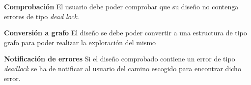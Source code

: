 \begin{functional}
	\item \textbf{Comprobación}\newline
		El usuario debe poder comprobar que su diseño no contenga errores de tipo \textit{dead lock}.
		\begin{functional}
			\item \textbf{Conversión a grafo}\newline
				El diseño se debe poder convertir a una estructura de tipo grafo para poder realizar la exploración del mismo
			\item \textbf{Notificación de errores}\newline
				Si el diseño comprobado contiene un error de tipo \textit{deadlock} se ha de notificar al usuario del camino
				escogido para encontrar dicho error.
		\end{functional}
\end{functional}